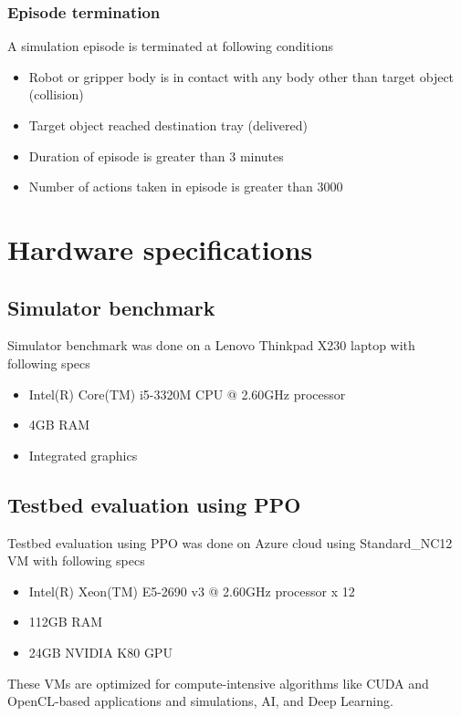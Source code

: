 \subsubsection{Episode termination}
A simulation episode is terminated at following conditions
\begin{itemize}
	\item Robot or gripper body is in contact with any body other than target object (collision)
	\item Target object reached destination tray (delivered)
	\item Duration of episode is greater than 3 minutes
	\item Number of actions taken in episode is greater than 3000
\end{itemize}

\section{Hardware specifications}
\subsection{Simulator benchmark}
Simulator benchmark was done on a Lenovo Thinkpad X230 laptop with following specs
\begin{itemize}
	\item Intel(R) Core(TM) i5-3320M CPU @ 2.60GHz processor
	\item 4GB RAM
	\item Integrated graphics
\end{itemize}

\subsection{Testbed evaluation using PPO}
Testbed evaluation using PPO was done on Azure cloud using Standard\_NC12 VM with following specs
\begin{itemize}
	\item Intel(R) Xeon(TM) E5-2690 v3 @ 2.60GHz processor x 12
	\item 112GB RAM
	\item 24GB NVIDIA K80 GPU
\end{itemize}

These VMs are optimized for compute-intensive algorithms like CUDA and OpenCL-based applications and simulations, AI, and Deep Learning. 